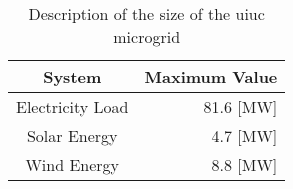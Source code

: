 \begin{table}[h]
  \centering
  \caption{Description of the size of the \gls{uiuc} microgrid}
  \label{tab:capacity}
  \begin{tabular}{c|r}
    \hline
    System & Maximum Value\\
    \hline
    Electricity Load & 81.6 [MW]\\
    Solar Energy & 4.7 [MW]\\
    Wind Energy & 8.8 [MW]
  \end{tabular}
\end{table}
